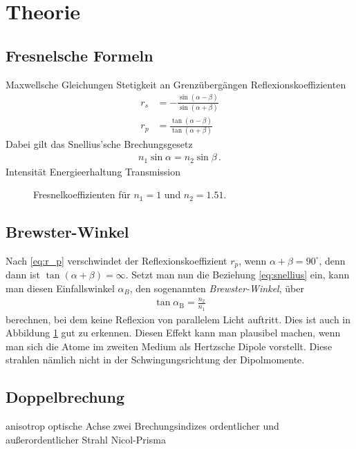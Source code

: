 \documentclass[12pt,a4paper,titlepage,headinclude,bibtotoc]{scrartcl}
\begin{document}
\section{Theorie}
\label{sec:theorie}
\subsection{Fresnelsche Formeln}
Maxwellsche Gleichungen
Stetigkeit an Grenzübergängen
Reflexionskoeffizienten
\begin{align}
	r_s&=-\frac{\sin(\alpha-\beta)}{\sin(\alpha+\beta)}
	\label{eq:r_s}\\
	r_p&=\frac{\tan(\alpha-\beta)}{\tan(\alpha+\beta)}
	\label{eq:r_p}
\end{align}
Dabei gilt das Snellius'sche Brechungsgesetz
\begin{align}
	n_1\sin\alpha=n_2\sin\beta\,.
	\label{eq:snellius}
\end{align}
Intensität
Energieerhaltung
Transmission

\begin{figure}[!h]
	\centering
	
	\caption{Fresnelkoeffizienten für $n_1=1$ und $n_2=1.51$.}
	\label{fig:fresnelkoeff}
\end{figure}

\subsection{Brewster-Winkel}
Nach \eqref{eq:r_p} verschwindet der Reflexionskoeffizient $r_p$, wenn $\alpha+\beta=90^\circ$, denn dann ist $\tan(\alpha+\beta)=\infty$.
Setzt man nun die Beziehung \eqref{eq:snellius} ein, kann man diesen Einfallswinkel $\alpha_B$, den sogenannten \emph{Brewster-Winkel}, über
\begin{align}
	\tan\alpha_\text{B}=\frac{n_2}{n_1}
\end{align}
berechnen, bei dem keine Reflexion von parallelem Licht auftritt.
Dies ist auch in Abbildung \ref{fig:fresnelkoeff} gut zu erkennen.
Diesen Effekt kann man plausibel machen, wenn man sich die Atome im zweiten Medium als Hertzsche Dipole vorstellt.
Diese strahlen nämlich nicht in der Schwingungsrichtung der Dipolmomente.

\subsection{Doppelbrechung}
anisotrop
optische Achse
zwei Brechungsindizes
ordentlicher und außerordentlicher Strahl
Nicol-Prisma
\end{document}
